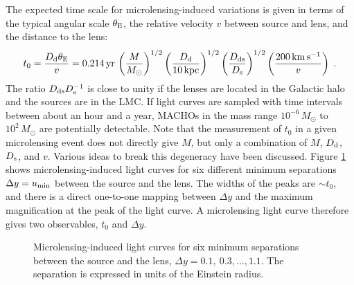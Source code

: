 \documentclass[a4paper,10pt]{article} %
\begin{document}
The expected time scale for microlensing-induced variations is given
in terms of the typical angular scale $\theta_{\rm E}$, the relative
velocity $v$ between source and lens, and the distance to the lens:
\begin{equation}
  t_0 = \frac{D_{\rm d}\theta_{\rm E}}{v} =
  0.214\,{\rm yr}\,\left(\frac{M}{M_\odot}\right)^{1/2}
  \left(\frac{D_{\rm d}}{10\,{\rm kpc}}\right)^{1/2}
  \left(\frac{D_{\rm ds}}{D_{\rm s}}\right)^{1/2}
  \left(\frac{200\,{\rm km}\,{\rm s}^{-1}}{v}\right)\;.
\label{eq:2.31}
\end{equation}
The ratio $D_{\rm ds}D_{\rm s}^{-1}$ is close to unity if the lenses
are located in the Galactic halo and the sources are in the LMC. If
light curves are sampled with time intervals between about an hour and
a year, MACHOs in the mass range $10^{-6}\,M_\odot$ to $10^2\,M_\odot$
are potentially detectable. Note that the measurement of $t_0$ in a
given microlensing event does not directly give $M$, but only a
combination of $M$, $D_{\rm d}$, $D_{\rm s}$, and $v$. Various ideas
to break this degeneracy have been discussed. Figure \ref{NB:fig2.8}
shows microlensing-induced light curves for six different minimum
separations $\Delta y=u_{\rm min}$ between the source and the lens.
The widths of the peaks are $\sim t_0$, and there is a direct
one-to-one mapping between $\Delta y$ and the maximum magnification at
the peak of the light curve. A microlensing light curve therefore
gives two observables, $t_0$ and $\Delta y$.

\begin{figure}[ht] %
\begin{center}
\begin{minipage}[t]{0.6\hsize}
\end{minipage}
\end{center}
\caption{Microlensing-induced light curves for six minimum separations
  between the source and the lens, $\Delta y=0.1,~0.3,\ldots,1.1$. The
  separation is expressed in units of the Einstein radius.}
\label{NB:fig2.8}
\end{figure}
\end{document}
